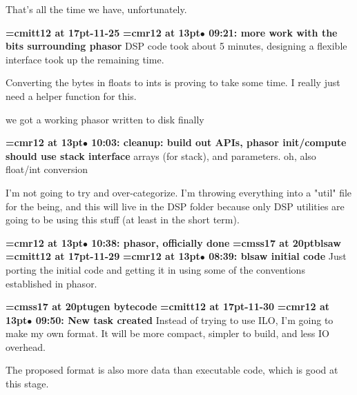 That's all the time we have, unfortunately. 
\par

{\medskip\noindent\bf\font\titlefont=cmitt12 at 17pt-11-25}\medskip
{\smallskip\noindent\bf\font\titlefont=cmr12 at 13pt\titlefont $\bullet$ 09:21: more work with the bits surrounding phasor}\smallskip
DSP code took about 5 minutes, designing a flexible interface took up the remaining time.
\par

Converting the bytes in floats to ints is proving to take some time. I really just need a helper function for this.
\par

we got a working phasor written to disk finally
\par

{\smallskip\noindent\bf\font\titlefont=cmr12 at 13pt\titlefont $\bullet$ 10:03: cleanup: build out APIs, phasor init/compute should use stack interface}\smallskip
arrays (for stack), and parameters. oh, also float/int conversion
\par

I'm not going to try and over-categorize. I'm throwing everything into a "util" file for the being, and this will live in the DSP folder because only DSP utilities are going to be using this stuff (at least in the short term).
\par

{\smallskip\noindent\bf\font\titlefont=cmr12 at 13pt\titlefont $\bullet$ 10:38: phasor, officially done}\smallskip
{}
{\medskip\noindent\bf\font\titlefont=cmss17 at 20pt\titlefont blsaw}\medskip
{\medskip\noindent\bf\font\titlefont=cmitt12 at 17pt-11-29}\medskip
{\smallskip\noindent\bf\font\titlefont=cmr12 at 13pt\titlefont $\bullet$ 08:39: blsaw initial code}\smallskip
Just porting the initial code and getting it in using some of the conventions established in phasor.
\par

{\medskip\noindent\bf\font\titlefont=cmss17 at 20pt\titlefont ugen bytecode}\medskip
{\medskip\noindent\bf\font\titlefont=cmitt12 at 17pt-11-30}\medskip
{\smallskip\noindent\bf\font\titlefont=cmr12 at 13pt\titlefont $\bullet$ 09:50: New task created}\smallskip
Instead of trying to use ILO, I'm going to make my own format. It will be more compact, simpler to build, and less IO overhead.
\par

The proposed format is also more data than executable code, which is good at this stage.
\par

